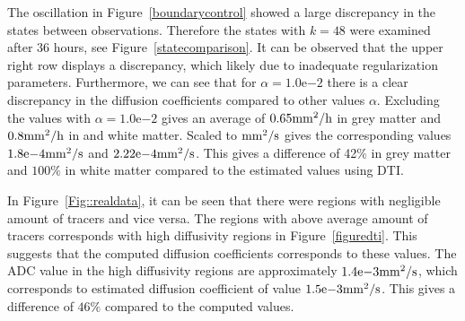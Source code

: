 \documentclass[11pt,a4paper]{article}
\newcommand{\fixme}[1]{\textcolor{orange}{#1}}
\begin{document}
The oscillation in Figure~\ref{boundarycontrol} showed a large discrepancy in the states between observations. Therefore the states with $k=48$ were examined after 36 hours, see Figure~\ref{statecomparison}. It can be observed that the upper right row displays a discrepancy, which likely due to inadequate regularization parameters. Furthermore, we can see that for $\alpha=1.0\mathrm{e}{-2}$ there is a clear discrepancy in the diffusion coefficients compared to other values $\alpha$. Excluding the values with $\alpha=1.0\mathrm{e}{-2}$ gives an average of $ 0.65 \mathrm{mm\sp{2}/h}$ in grey matter and $ 0.8 \mathrm{mm\sp{2}/h}$ in and white matter. Scaled to $\mathrm{mm\sp{2}/s}$ gives the corresponding values $1.8\mathrm{e}{-4}\mathrm{mm\sp{2}/s}$ and $2.22\mathrm{e}{-4} \mathrm{mm\sp{2}/s}$. This gives a difference of 42\% in grey matter and $ 100 \%$ in white matter compared to the estimated values using DTI.


In Figure~\ref{Fig::realdata}, it can be seen that there were regions with negligible amount of tracers and vice versa. The regions with above average amount of tracers corresponds with high diffusivity regions in Figure~\ref{figuredti}. This suggests that the computed diffusion coefficients corresponds to these values. The ADC value in the high diffusivity regions are approximately  $1.4\mathrm{e}{-3} \mathrm{mm\sp{2}/s}$, which corresponds to estimated diffusion coefficient of value $1.5\mathrm{e}{-3} \mathrm{mm\sp{2}/s}$. This gives a difference of $ 46 \%$ compared to the computed values.


















\end{document}
